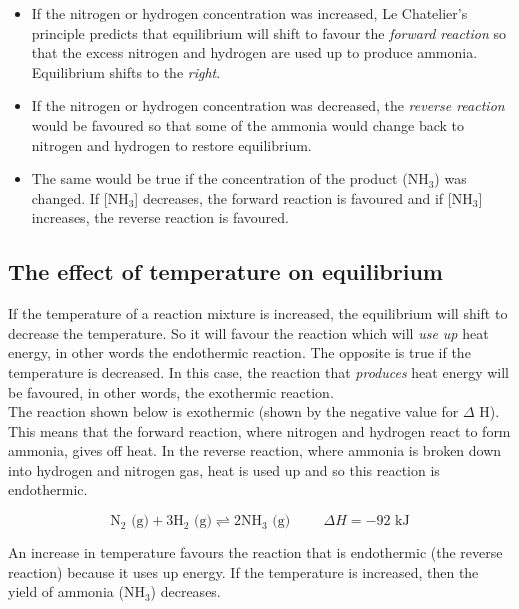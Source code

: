 \begin{itemize}
\item{If the nitrogen or hydrogen concentration was increased, Le Chatelier's principle predicts that equilibrium will shift to favour the \textit{forward reaction} so that the excess nitrogen and hydrogen are used up to produce ammonia. Equilibrium shifts to the \textit{right}.} 

\item{If the nitrogen or hydrogen concentration was decreased, the \textit{reverse reaction} would be favoured so that some of the ammonia would change back to nitrogen and hydrogen to restore equilibrium.}

\item{The same would be true if the concentration of the product (NH$_{3}$) was changed. If [NH$_{3}$] decreases, the forward reaction is favoured and if [NH$_{3}$] increases, the reverse reaction is favoured.}
\end{itemize}


\subsection{The effect of temperature on equilibrium}

If the temperature of a reaction mixture is increased, the equilibrium will shift to decrease the temperature. So
it will favour the reaction which will \textit{use up} heat energy, in other words the endothermic reaction. The opposite is true if the temperature is decreased. In this case, the reaction that \textit{produces} heat energy will be favoured, in other words, the exothermic reaction.\\

The reaction shown below is exothermic (shown by the negative value for $\Delta$ H). This means that the forward reaction, where nitrogen and hydrogen react to form ammonia, gives off heat. In the reverse reaction, where ammonia is broken down into hydrogen and nitrogen gas, heat is used up and so this reaction is endothermic.

\begin{equation*}
\text{N}_{2}\text{ (g)} + 3\text{H}_{2}\text{ (g)} \rightleftharpoons  2\text{NH}_{3}\text{ (g)} \hspace{1cm} \Delta H = -92 \text{ kJ}
\end{equation*}

An increase in temperature favours the reaction that is endothermic (the reverse reaction) because it uses up energy. If the temperature is increased, then the yield of ammonia (NH$_{3}$) decreases. \\

